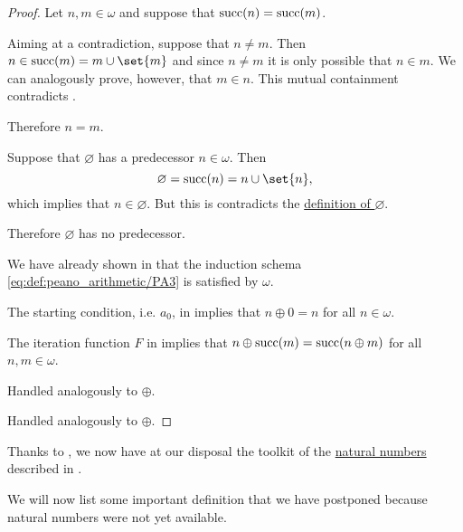 \begin{proof}
   Let \( n, m \in \omega \) and suppose that \( \operatorname{succ}(n) = \operatorname{succ}(m) \).

  Aiming at a contradiction, suppose that \( n \neq m \). Then \( n \in \op{succ}(m) = m \cup \set{ m } \) and since \( n \neq m \) it is only possible that \( n \in m \). We can analogously prove, however, that \( m \in n \). This mutual containment contradicts .

  Therefore \( n = m \).

   Suppose that \( \varnothing \) has a predecessor \( n \in \omega \). Then
  \begin{equation*}
    \varnothing = \op{succ}(n) = n \cup \set{ n },
  \end{equation*}
  which implies that \( n \in \varnothing \). But this is contradicts the \hyperref[def:empty_set]{definition of \( \varnothing \)}.

  Therefore \( \varnothing \) has no predecessor.

   We have already shown in  that the induction schema \eqref{eq:def:peano_arithmetic/PA3} is satisfied by \( \omega \).

   The starting condition, i.e. \( a_0 \), in  implies that \( n \oplus 0 = n \) for all \( n \in \omega \).

   The iteration function \( F \) in  implies that \( n \oplus \operatorname{succ}(m) = \operatorname{succ}(n \oplus m) \) for all \( n, m \in \omega \).

   Handled analogously to \( \oplus \).

   Handled analogously to \( \oplus \).
\end{proof}

\begin{remark}\label{rem:natural_number_availability_zfc}
  Thanks to , we now have at our disposal the toolkit of the \hyperref[def:natural_numbers]{natural numbers} described in .

  We will now list some important definition that we have postponed because natural numbers were not yet available.
\end{remark}

